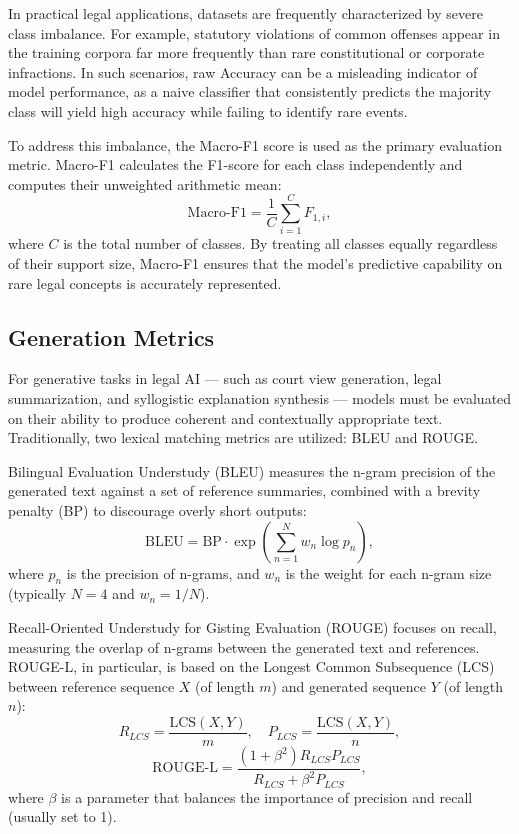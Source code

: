 In practical legal applications, datasets are frequently characterized by severe class imbalance. For example, statutory violations of common offenses appear in the training corpora far more frequently than rare constitutional or corporate infractions. In such scenarios, raw Accuracy can be a misleading indicator of model performance, as a naive classifier that consistently predicts the majority class will yield high accuracy while failing to identify rare events. 

To address this imbalance, the Macro-F1 score is used as the primary evaluation metric. Macro-F1 calculates the F1-score for each class independently and computes their unweighted arithmetic mean:
\begin{equation}
    \text{Macro-F1} = \frac{1}{C} \sum_{i=1}^C F_{1, i},
\end{equation}
where $C$ is the total number of classes. By treating all classes equally regardless of their support size, Macro-F1 ensures that the model's predictive capability on rare legal concepts is accurately represented.

\subsection{Generation Metrics}

For generative tasks in legal AI --- such as court view generation, legal summarization, and syllogistic explanation synthesis --- models must be evaluated on their ability to produce coherent and contextually appropriate text. Traditionally, two lexical matching metrics are utilized: BLEU and ROUGE.

Bilingual Evaluation Understudy (BLEU) measures the n-gram precision of the generated text against a set of reference summaries, combined with a brevity penalty (BP) to discourage overly short outputs:
\begin{equation}
    \text{BLEU} = \text{BP} \cdot \exp\left(\sum_{n=1}^N w_n \log p_n\right),
\end{equation}
where $p_n$ is the precision of n-grams, and $w_n$ is the weight for each n-gram size (typically $N=4$ and $w_n = 1/N$).

Recall-Oriented Understudy for Gisting Evaluation (ROUGE) focuses on recall, measuring the overlap of n-grams between the generated text and references. ROUGE-L, in particular, is based on the Longest Common Subsequence (LCS) between reference sequence $X$ (of length $m$) and generated sequence $Y$ (of length $n$):
\begin{equation}
    R_{LCS} = \frac{\text{LCS}(X, Y)}{m}, \quad P_{LCS} = \frac{\text{LCS}(X, Y)}{n},
\end{equation}
\begin{equation}
    \text{ROUGE-L} = \frac{(1 + \beta^2) R_{LCS} P_{LCS}}{R_{LCS} + \beta^2 P_{LCS}},
\end{equation}
where $\beta$ is a parameter that balances the importance of precision and recall (usually set to 1).

